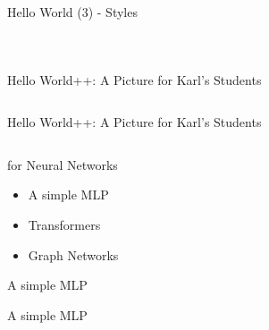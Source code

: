 \begin{frame}{Hello World (3) - Styles}
  \begin{columns}
    \begin{column}{0.35\textwidth}
      
    \end{column}
    \begin{column}{0.65\textwidth}
      \inputminted[firstline=5,lastline=13]{TeX}{img/tutorial/karl/karl_step_3_standalone.tex}
    \end{column}
  \end{columns}
\end{frame}

\begin{frame}{Hello World++: A Picture for Karl’s Students}
    \inputminted[lastline=26]{TeX}{img/tutorial/karl/karl.tex}
\end{frame}
\begin{frame}{Hello World++: A Picture for Karl’s Students}
    \inputminted[firstline=27]{TeX}{img/tutorial/karl/karl.tex}
\end{frame}

\begin{frame}{\TikZ for Neural Networks}
    \begin{itemize}
        \item A simple MLP
        \item Transformers
        \item Graph Networks
    \end{itemize}
\end{frame}

\begin{frame}{A simple MLP}
  \begin{figure}
    \centering
    \begin{adjustbox}{height=0.88\textheight, center}
      
    \end{adjustbox}
  \end{figure}
\end{frame}

\begin{frame}{A simple MLP}
  \begin{columns}
    \begin{column}{0.26\textwidth}
      \begin{figure}
        \centering
        \begin{adjustbox}{height=0.48\textheight, center}
          
        \end{adjustbox}
      \end{figure}
    \end{column}
    \begin{column}{0.74\textwidth}
      \inputminted[]{TeX}{img/tutorial/mlp/mlp_step_1.tex}
    \end{column}
  \end{columns}
\end{frame}

